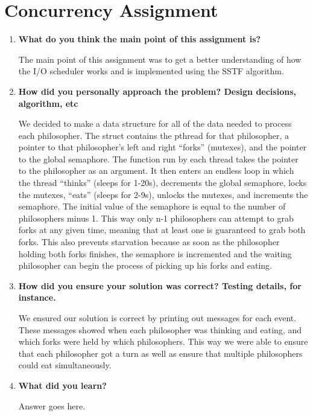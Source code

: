 {\bf }\documentclass[letterpaper,10pt,titlepage,draftclsnofoot,onecolumn]{IEEEtran}
\begin{document}
\section{Concurrency Assignment}
\begin{enumerate}
\item \textbf{What do you think the main point of this assignment is?}

The main point of this assignment was to get a better understanding of how the I/O scheduler works and is implemented using the SSTF algorithm. \par

\item \textbf{How did you personally approach the problem? Design decisions, algorithm, etc}

We decided to make a data structure for all of the data needed to process each philosopher. The struct contains the pthread for that philosopher, a pointer to that philosopher's left and right ``forks'' (mutexes), and the pointer to the global semaphore. The function run by each thread takes the pointer to the philosopher as an argument. It then enters an endless loop in which the thread ``thinks'' (sleeps for 1-20s), decrements the global semaphore, locks the mutexes, ``eats'' (sleeps for 2-9s), unlocks the mutexes, and increments the semaphore. The initial value of the semaphore is equal to the number of philosophers minus 1. This way only n-1 philosophers can attempt to grab forks at any given time, meaning that at least one is guaranteed to grab both forks. This also prevents starvation because as soon as the philosopher holding both forks finishes, the semaphore is incremented and the waiting philosopher can begin the process of picking up his forks and eating.

\item \textbf{How did you ensure your solution was correct? Testing details, for instance.}

We ensured our solution is correct by printing out messages for each event. These messages showed when each philosopher was thinking and eating, and which forks were held by which philosophers. This way we were able to ensure that each philosopher got a turn as well as ensure that multiple philosophers could eat simultaneously.

\item \textbf{What did you learn?}

Answer goes here.

\end{enumerate}

\nocite{*}



\end{document}
